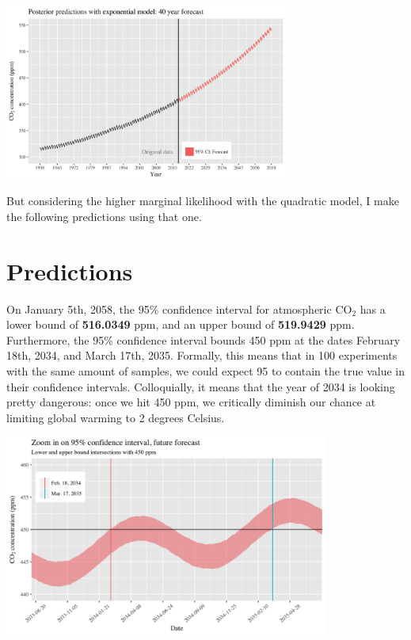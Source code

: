 \documentclass[]{article}
\let\origfigure=\figure
\let\endorigfigure=\endfigure
\renewenvironment{figure}[1][]{%
  \origfigure[H]
}{%
  \endorigfigure
}
\begin{document}
\begin{figure}
\centering
\includegraphics[width=0.7\textwidth]{mauna_loa/exp_forecast.png}
\caption{Exponential forecast}
\end{figure}

But considering the higher marginal likelihood with the quadratic model,
I make the following predictions using that one.

\hypertarget{predictions}{%
\section{Predictions}\label{predictions}}

On January 5th, 2058, the 95\% confidence interval for atmospheric
CO\(_2\) has a lower bound of \textbf{516.0349} ppm, and an upper bound
of \textbf{519.9429} ppm. Furthermore, the 95\% confidence interval
bounds 450 ppm at the dates February 18th, 2034, and March 17th, 2035.
Formally, this means that in 100 experiments with the same amount of
samples, we could expect 95 to contain the true value in their
confidence intervals. Colloquially, it means that the year of 2034 is
looking pretty dangerous: once we hit 450 ppm, we critically diminish
our chance at limiting global warming to 2 degrees Celsius.

\begin{figure}
\centering
\includegraphics[width=0.8\textwidth]{mauna_loa/zoom-in.png}
\caption{Upper and lower confidence bounds, 450 ppm}
\end{figure}




\newpage
\singlespacing 
\end{document}

